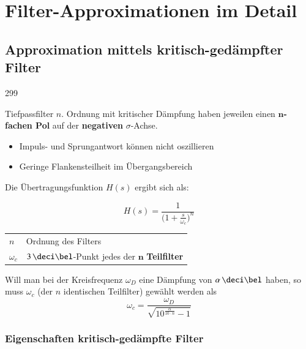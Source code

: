 \section{Filter-Approximationen im Detail}

\subsection{Approximation mittels kritisch-gedämpfter Filter}{299}

Tiefpassfilter $n.$ Ordnung mit kritischer Dämpfung haben jeweilen einen $\bm{n}$\textbf{-fachen Pol} auf der \textbf{negativen}
$\sigma$-Achse.

\begin{itemize}
    \item Impuls- und Sprungantwort können nicht oszillieren
    \item Geringe Flankensteilheit im Übergangsbereich
\end{itemize}
\vspace{0.2cm}

Die Übertragungsfunktion $H(s)$ ergibt sich als:

\begin{minipage}[c]{0.48\columnwidth}
    $$ \boxed{ H(s) = \frac{1}{\Big( 1 + \frac{s}{\omega_c} \Big)^n} } $$
\end{minipage}
\hfill
\begin{minipage}[c]{0.48\columnwidth}
    \begin{tabular}{ll}
        $n$         & Ordnung des Filters \\
        $\omega_c$  & $3 \, \deci \bel$-Punkt jedes der $\bm{n}$ \textbf{Teilfilter}
    \end{tabular}
\end{minipage}

\vspace{0.2cm}
Will man bei der Kreisfrequenz $\omega_D$ eine Dämpfung von $\alpha \, \deci \bel$ haben, so muss $\omega_c$ (der $n$ identischen
Teilfilter) gewählt werden als
$$ \boxed{ \omega_c = \frac{\omega_D}{\sqrt{10^{\frac{\alpha}{10 \cdot n}} -1}} } $$ 


\subsubsection{Eigenschaften kritisch-gedämpfte Filter}

